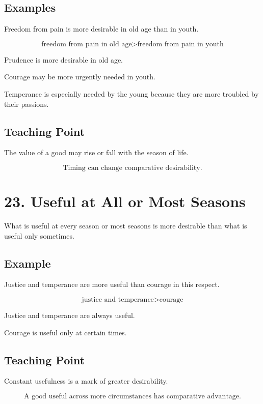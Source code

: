\documentclass[12pt]{article}
\begin{document}
\subsection*{Examples}

Freedom from pain is more desirable in old age than in youth.

\[
\text{freedom from pain in old age} > \text{freedom from pain in youth}
\]

Prudence is more desirable in old age.

Courage may be more urgently needed in youth.

Temperance is especially needed by the young because they are more troubled by
their passions.

\subsection*{Teaching Point}

The value of a good may rise or fall with the season of life.

\[
\boxed{
\text{Timing can change comparative desirability.}
}
\]

\section*{23. Useful at All or Most Seasons}

What is useful at every season or most seasons is more desirable than what is
useful only sometimes.

\subsection*{Example}

Justice and temperance are more useful than courage in this respect.

\[
\text{justice and temperance} > \text{courage}
\]

Justice and temperance are always useful.

Courage is useful only at certain times.

\subsection*{Teaching Point}

Constant usefulness is a mark of greater desirability.

\[
\boxed{
\text{A good useful across more circumstances has comparative advantage.}
}
\]
\end{document}
